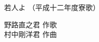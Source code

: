 \documentclass[10pt,b5j]{tarticle} %
\begin{document}
\begin{minipage}[c]{0.7\hsize} %
    \begin{center}
        {\LARGE
            若人よ %
        }
        {\small 
            （平成十二年度寮歌） %
        }
    \end{center}
\end{minipage}
\begin{minipage}[c]{0.3\hsize} %
    \begin{flushright} %
        野路直之君 作歌\\村中剛洋君 作曲 %
    \end{flushright}
\end{minipage}
\end{document}
